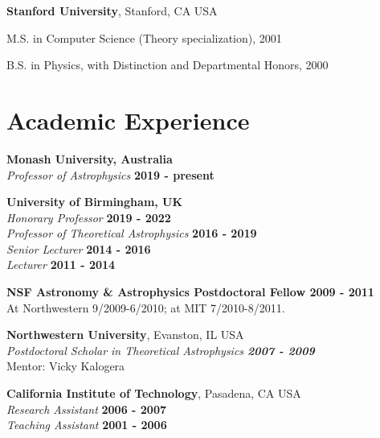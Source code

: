 \documentclass[margin,line]{res}
\newenvironment{list1}{
  \begin{list}{\ding{113}}{%
      \setlength{\itemsep}{0in}
      \setlength{\parsep}{0in} \setlength{\parskip}{0in}
      \setlength{\topsep}{0in} \setlength{\partopsep}{0in} 
      \setlength{\leftmargin}{0.17in}}}{\end{list}}
\begin{document}
\begin{resume}
{\bf Stanford University}, Stanford, CA USA\\
\vspace*{-.1in}
\begin{list1}
\item[] M.S. in Computer Science (Theory specialization), 2001
\vspace*{.05in}
\item[] B.S. in Physics, with Distinction and Departmental Honors, 2000 
\end{list1}


\section{\sc Academic Experience}

{\bf Monash University, Australia}\\
{\em Professor of Astrophysics}  \hfill {\bf 2019 - present}

{\bf University of Birmingham, UK}\\
{\em Honorary Professor}  \hfill {\bf 2019 - 2022}\\
{\em Professor of Theoretical Astrophysics} \hfill {\bf 2016 - 2019}\\
{\em Senior Lecturer} \hfill {\bf 2014 - 2016}\\
{\em Lecturer} \hfill {\bf 2011 - 2014}

{\bf NSF Astronomy \& Astrophysics Postdoctoral Fellow \hfill {2009 - 2011}}\\
At Northwestern 9/2009-6/2010; at MIT 7/2010-8/2011.
 
{\bf Northwestern University}, Evanston, IL USA\\
\vspace*{.02in}
{\em Postdoctoral Scholar in Theoretical Astrophysics  \hfill {\bf 2007 - 2009}}\\
Mentor: Vicky Kalogera

{\bf California Institute of Technology}, Pasadena, CA USA\\
\vspace*{.02in}
{\em Research Assistant} \hfill {\bf 2006 - 2007}\\
\vspace*{0.02in}
 {\em Teaching Assistant} \hfill {\bf 2001 - 2006}


\end{resume}
\end{document}
